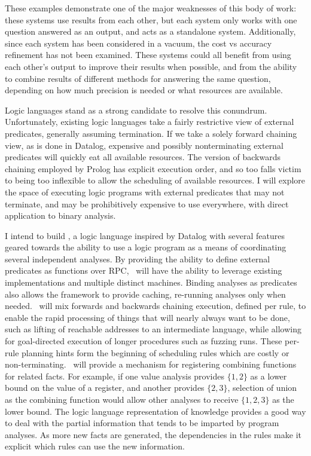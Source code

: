 These examples demonstrate one of the major weaknesses of this body of work: these systems use results from each other, but each system only works with one question answered as an output, and acts as a standalone system.
Additionally, since each system has been considered in a vacuum, the cost vs accuracy refinement has not been examined.
These systems could all benefit from using each other's output to improve their results when possible, and from the ability to combine results of different methods for answering the same question, depending on how much precision is needed or what resources are available.

Logic languages stand as a strong candidate to resolve this conundrum. Unfortunately, existing logic languages take a fairly restrictive view of external predicates, generally assuming termination.
If we take a solely forward chaining view, as is done in Datalog, expensive and possibly nonterminating external predicates will quickly eat all available resources.
The version of backwards chaining employed by Prolog has explicit execution order, and so too falls victim to being too inflexible to allow the scheduling of available resources.
I will explore the space of executing logic programs with external predicates that may not terminate, and may be prohibitively expensive to use everywhere, with direct application to binary analysis.

I intend to build \sysname, a logic language inspired by Datalog with several features geared towards the ability to use a logic program as a means of coordinating several independent analyses.
By providing the ability to define external predicates as functions over RPC, \sysname\ will have the ability to leverage existing implementations and multiple distinct machines.
Binding analyses as predicates also allows the framework to provide caching, re-running analyses only when needed.
\sysname\ will mix forwards and backwards chaining execution, defined per rule, to enable the rapid processing of things that will nearly always want to be done, such as lifting of reachable addresses to an intermediate language, while allowing for goal-directed execution of longer procedures such as fuzzing runs.
These per-rule planning hints form the beginning of scheduling rules which are costly or non-terminating.
\sysname\ will provide a mechanism for registering combining functions for related facts.
For example, if one value analysis provides $\{1, 2\}$ as a lower bound on the value of a register, and another provides $\{2, 3\}$, selection of union as the combining function would allow other analyses to receive $\{1, 2, 3\}$ as the lower bound.
The logic language representation of knowledge provides a good way to deal with the partial information that tends to be imparted by program analyses. As more new facts are generated, the dependencies in the rules make it explicit which rules can use the new information.

